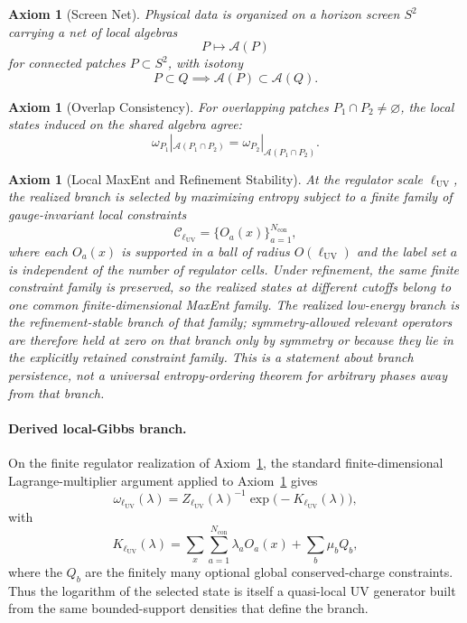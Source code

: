 \documentclass[11pt]{article}
\newtheorem{axiom}[theorem]{Axiom}
\begin{document}
\begin{axiom}[Screen Net]\label{ax:screen}
Physical data is organized on a horizon screen \(S^2\) carrying a net of local algebras
\[
P \longmapsto \mathcal A(P)
\]
for connected patches \(P\subset S^2\), with isotony
\[
P\subset Q \implies \mathcal A(P)\subset \mathcal A(Q).
\]
\end{axiom}

\begin{axiom}[Overlap Consistency]\label{ax:overlap}
For overlapping patches \(P_1\cap P_2\neq\varnothing\), the local states induced on the shared algebra agree:
\[
\omega_{P_1}|_{\mathcal A(P_1\cap P_2)}
=
\omega_{P_2}|_{\mathcal A(P_1\cap P_2)}.
\]
\end{axiom}

\begin{axiom}[Local MaxEnt and Refinement Stability]\label{ax:maxent}
At the regulator scale \(\ell_{\mathrm{UV}}\), the realized branch is selected by maximizing entropy subject to a finite family of gauge-invariant local constraints
\[
\mathcal C_{\ell_{\mathrm{UV}}}=\{O_a(x)\}_{a=1}^{N_{\mathrm{con}}},
\]
where each \(O_a(x)\) is supported in a ball of radius \(O(\ell_{\mathrm{UV}})\) and the label set \(a\) is independent of the number of regulator cells. Under refinement, the same finite constraint family is preserved, so the realized states at different cutoffs belong to one common finite-dimensional MaxEnt family. The realized low-energy branch is the refinement-stable branch of that family; symmetry-allowed relevant operators are therefore held at zero on that branch only by symmetry or because they lie in the explicitly retained constraint family. This is a statement about branch persistence, not a universal entropy-ordering theorem for arbitrary phases away from that branch.
\end{axiom}

\paragraph{Derived local-Gibbs branch.}
On the finite regulator realization of Axiom~\ref{ax:screen}, the standard finite-dimensional Lagrange-multiplier argument applied to Axiom~\ref{ax:maxent} gives
\[
\omega_{\ell_{\mathrm{UV}}}(\lambda)
=
Z_{\ell_{\mathrm{UV}}}(\lambda)^{-1}\exp\!\bigl(-K_{\ell_{\mathrm{UV}}}(\lambda)\bigr),
\]
with
\[
K_{\ell_{\mathrm{UV}}}(\lambda)
=
\sum_x \sum_{a=1}^{N_{\mathrm{con}}}\lambda_a O_a(x)
+\sum_b \mu_b Q_b,
\]
where the \(Q_b\) are the finitely many optional global conserved-charge constraints. Thus the logarithm of the selected state is itself a quasi-local UV generator built from the same bounded-support densities that define the branch.
\end{document}
